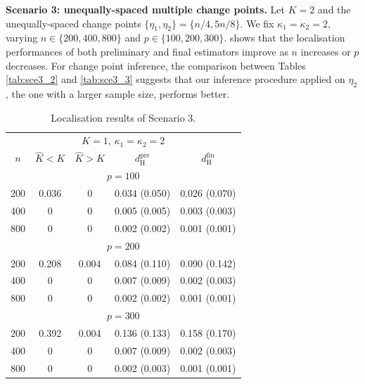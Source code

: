 \documentclass[11pt]{article}
\theoremstyle{plain}
\theoremstyle{definition}
\begin{document}
\medskip  
\noindent \textbf{Scenario 3: unequally-spaced multiple change points.} Let $K = 2$ and the unequally-spaced change points $\{\eta_1, \eta_2\} = \{n/4, 5n/8\}$. We fix $\kappa_1 = \kappa_2 = 2$, varying $n \in \{200, 400, 800\}$ and $p \in \{100, 200, 300\}$.  shows that the localisation performances of both preliminary and final estimators improve as $n$ increases or $p$ decreases. For change point inference, the comparison between Tables \ref{tab:sce3_2} and \ref{tab:sce3_3} suggests that our inference procedure applied on $\eta_2$, the one with a larger sample size, performs better.

\begin{table}[htbp]
\centering
\caption{Localisation results of Scenario 3. }
\begin{tabular}{ccccc}
\hline
\multicolumn{5}{c}{$K = 1$, $\kappa_1 = \kappa_2 = 2$} \\ 
$n$   & $\widehat{K} < K$ & $\widehat{K} > K$ & $d_{\mathrm{H}}^{\mathrm{pre}}$ & $d_{\mathrm{H}}^{\mathrm{fin}}$ \\ \hline
\multicolumn{5}{c}{$p = 100$}                                                                             \\
200 & 0.036    & 0        & 0.034 (0.050)  & 0.026 (0.070)  \\
400 & 0        & 0    & 0.005 (0.005)  & 0.003 (0.003)   \\
800 & 0        & 0    & 0.002 (0.002)  & 0.001 (0.001)   \\
\multicolumn{5}{c}{$p = 200$}                                                                             \\
200 & 0.208    & 0.004        & 0.084 (0.110)  & 0.090 (0.142)   \\
400 & 0        & 0    & 0.007 (0.009)  & 0.002 (0.003)   \\
800 & 0        & 0    & 0.002 (0.002)  & 0.001 (0.001)   \\
\multicolumn{5}{c}{$p = 300$}                                                                             \\
200 & 0.392    & 0.004        & 0.136 (0.133)   & 0.158 (0.170)   \\
400 & 0      & 0      & 0.007 (0.009)  & 0.002 (0.003)   \\
800 & 0      & 0      & 0.002 (0.003)  & 0.001 (0.001)   \\
\hline
\end{tabular}
\label{tab:sce3_1}
\end{table}
\end{document}
